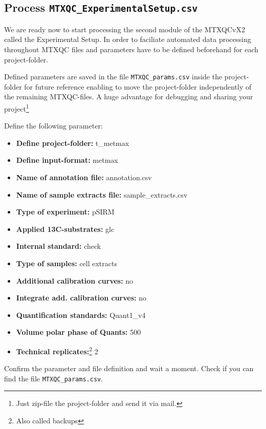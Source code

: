 \documentclass[]{book}
\providecommand{\tightlist}{%
  \setlength{\itemsep}{0pt}\setlength{\parskip}{0pt}}
\let\rmarkdownfootnote\footnote%
\def\footnote{\protect\rmarkdownfootnote}
\begin{document}
\hypertarget{process-mtxqc_experimentalsetup.csv-1}{%
\subsection{\texorpdfstring{Process \texttt{MTXQC\_ExperimentalSetup.csv}}{Process MTXQC\_ExperimentalSetup.csv}}\label{process-mtxqc_experimentalsetup.csv-1}}

We are ready now to start processing the second module of the MTXQCvX2 called the Experimental Setup.
In order to faciliate automated data processing throughout MTXQC files and parameters have to be defined beforehand for each project-folder.

Defined parameters are saved in the file \texttt{MTXQC\_params.csv} inside the project-folder for future reference enabling to move the project-folder independently of the remaining MTXQC-files. A huge advantage for debugging and sharing your project\footnote{Just zip-file the project-folder and send it via mail.}

Define the following parameter:

\begin{itemize}
\tightlist
\item
  \textbf{Define project-folder:} t\_metmax
\item
  \textbf{Define input-format:} metmax
\item
  \textbf{Name of annotation file:} annotation.csv
\item
  \textbf{Name of sample extracts file:} sample\_extracts.csv
\item
  \textbf{Type of experiment:} pSIRM
\item
  \textbf{Applied 13C-substrates:} glc
\item
  \textbf{Internal standard:} check
\item
  \textbf{Type of samples:} cell extracts
\item
  \textbf{Additional calibration curves:} no
\item
  \textbf{Integrate add. calibration curves:} no
\item
  \textbf{Quantification standards:} Quant1\_v4
\item
  \textbf{Volume polar phase of Quants:} 500
\item
  \textbf{Technical replicates:}\footnote{Also called backups} 2
\end{itemize}

Confirm the parameter and file definition and wait a moment. Check if you can find the file \texttt{MTXQC\_params.csv}.
\end{document}
